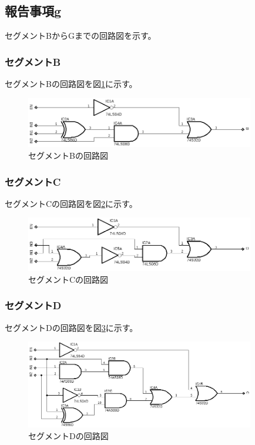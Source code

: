 \documentclass[a4paper,11pt,dvipdfmx]{jsarticle}
\begin{document}
\subsection{報告事項g}
セグメントBからGまでの回路図を示す。
\subsubsection{セグメントB}
セグメントBの回路図を図\ref{fig:segmentB}に示す。
\begin{figure}[H]
  \centering
  \includegraphics[width=10cm]{./images/B.png}
  \caption{セグメントBの回路図}
  \label{fig:segmentB}
\end{figure}

\subsubsection{セグメントC}
セグメントCの回路図を図\ref{fig:segmentC}に示す。
\begin{figure}[H]
  \centering
  \includegraphics[width=10cm]{./images/C.png}
  \caption{セグメントCの回路図}
  \label{fig:segmentC}
\end{figure}

\subsubsection{セグメントD}
セグメントDの回路図を図\ref{fig:segmentD}に示す。
\begin{figure}[H]
  \centering
  \includegraphics[width=10cm]{./images/D.png}
  \caption{セグメントDの回路図}
  \label{fig:segmentD}
\end{figure}
\end{document}
